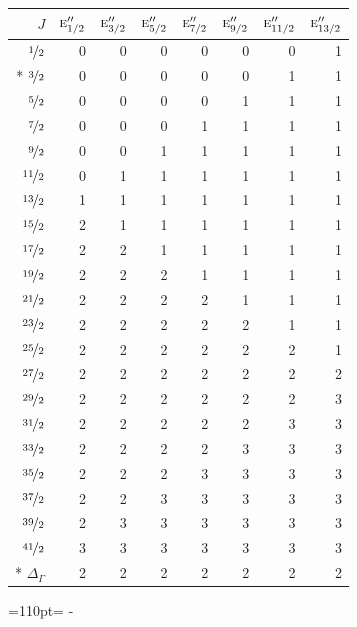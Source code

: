 \documentclass[10pt,a4paper]{article}
\makeatletter
\def\grouprule#1#2{\noalign{\marks\LTgroupmarks{\the\belowrulesep}\nobreak\vskip#1%
  \vskip\aboverulesep}\multispan\LT@cols\unskip{\leaders\hrule\@height#2\hfill\kern\z@}\cr
  \noalign{\penalty\LTrulebreak\vskip\belowrulesep\global\@lastruleclass\z@}}
\newcommand{\needspace}[1]{\par\penalty-100\begingroup\dimen0=#1\relax\dimen2=\pagegoal
  \advance\dimen2-\pagetotal\ifdim\dimen0>\dimen2\relax\ifdim\dimen2>0pt\vfil\break\fi\fi
  \endgroup}
\numberwithin{equation}{section}
\newcommand{\irr}[1]{\text{\normalfont\scshape #1}}
\makeatother
\begin{document}
{\small\begin{longtable}{@{}rrrrrrrr@{}}\toprule
$J$ & $\irr{e}_{1/2}''$ & $\irr{e}_{3/2}''$ & $\irr{e}_{5/2}''$ & $\irr{e}_{7/2}''$ & $\irr{e}_{9/2}''$ & $\irr{e}_{11/2}''$ & $\irr{e}_{13/2}''$\\\midrule\endhead
\bottomrule\endfoot\endlastfoot
$\nicefrac{1}{2}$ & 0 & 0 & 0 & 0 & 0 & 0 & 1\\*
$\nicefrac{3}{2}$ & 0 & 0 & 0 & 0 & 0 & 1 & 1\\
$\nicefrac{5}{2}$ & 0 & 0 & 0 & 0 & 1 & 1 & 1\\
$\nicefrac{7}{2}$ & 0 & 0 & 0 & 1 & 1 & 1 & 1\\
$\nicefrac{9}{2}$ & 0 & 0 & 1 & 1 & 1 & 1 & 1\\
$\nicefrac{11}{2}$ & 0 & 1 & 1 & 1 & 1 & 1 & 1\\
$\nicefrac{13}{2}$ & 1 & 1 & 1 & 1 & 1 & 1 & 1\\
$\nicefrac{15}{2}$ & 2 & 1 & 1 & 1 & 1 & 1 & 1\\
$\nicefrac{17}{2}$ & 2 & 2 & 1 & 1 & 1 & 1 & 1\\
$\nicefrac{19}{2}$ & 2 & 2 & 2 & 1 & 1 & 1 & 1\\
$\nicefrac{21}{2}$ & 2 & 2 & 2 & 2 & 1 & 1 & 1\\
$\nicefrac{23}{2}$ & 2 & 2 & 2 & 2 & 2 & 1 & 1\\
$\nicefrac{25}{2}$ & 2 & 2 & 2 & 2 & 2 & 2 & 1\\
$\nicefrac{27}{2}$ & 2 & 2 & 2 & 2 & 2 & 2 & 2\\
$\nicefrac{29}{2}$ & 2 & 2 & 2 & 2 & 2 & 2 & 3\\
$\nicefrac{31}{2}$ & 2 & 2 & 2 & 2 & 2 & 3 & 3\\
$\nicefrac{33}{2}$ & 2 & 2 & 2 & 2 & 3 & 3 & 3\\
$\nicefrac{35}{2}$ & 2 & 2 & 2 & 3 & 3 & 3 & 3\\
$\nicefrac{37}{2}$ & 2 & 2 & 3 & 3 & 3 & 3 & 3\\
$\nicefrac{39}{2}$ & 2 & 3 & 3 & 3 & 3 & 3 & 3\\
$\nicefrac{41}{2}$ & 3 & 3 & 3 & 3 & 3 & 3 & 3\\*
\grouprule{0pt}{\lightrulewidth} $\Delta_\Gamma$ & 2 & 2 & 2 & 2 & 2 & 2 & 2\\
\bottomrule\end{longtable}}
\needspace{110pt}
\end{document}
